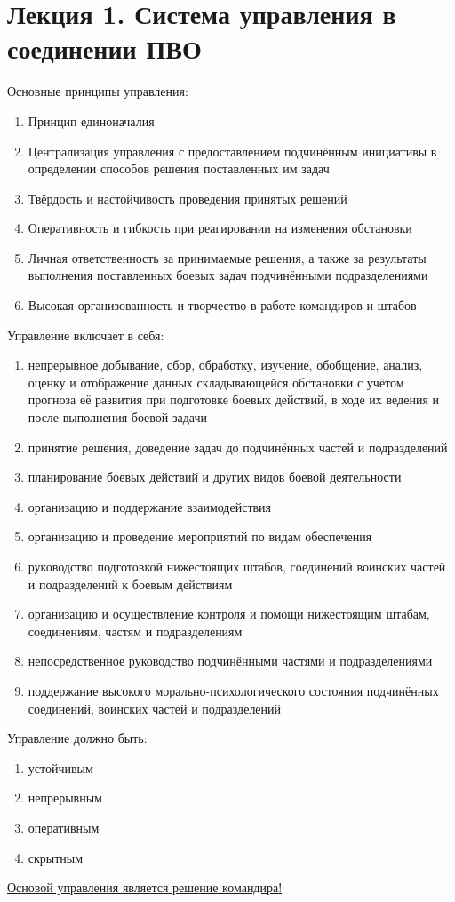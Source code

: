 \documentclass[a4paper,12pt]{article}
\begin{document}
	\section{\bf Лекция 1. Система управления в соединении ПВО}
	Основные принципы управления:
	\begin{enumerate}
		\item Принцип единоначалия
		\item Централизация управления с предоставлением подчинённым инициативы в определении
		способов решения поставленных им задач
		\item Твёрдость и настойчивость проведения принятых решений
		\item Оперативность и гибкость при реагировании на изменения обстановки
		\item Личная ответственность за принимаемые решения, а также за результаты выполнения
		поставленных боевых задач подчинёнными подразделениями
		\item Высокая организованность и творчество в работе командиров и штабов
	\end{enumerate}
	Управление включает в себя:
	\begin{enumerate}
		\item непрерывное добывание, сбор, обработку, изучение, обобщение, анализ, оценку и 
		отображение данных складывающейся обстановки с учётом прогноза её развития при
		подготовке боевых действий, в ходе их ведения и после выполнения боевой задачи
		\item принятие решения, доведение задач до подчинённых частей и подразделений
		\item планирование боевых действий и других видов боевой деятельности
		\item организацию и поддержание взаимодействия
		\item организацию и проведение мероприятий по видам обеспечения
		\item руководство подготовкой нижестоящих штабов, соединений воинских частей и 
		подразделений к боевым действиям
		\item организацию и осуществление контроля и помощи нижестоящим штабам, соединениям, 
		частям и подразделениям
		\item непосредственное руководство подчинёнными частями и подразделениями
		\item поддержание высокого морально-психологического состояния подчинённых соединений, 
		воинских частей и подразделений
	\end{enumerate}
	Управление должно быть:
	\begin{enumerate}
		\item устойчивым
		\item непрерывным
		\item оперативным
		\item скрытным
	\end{enumerate} 
	\underline{Основой управления является решение командира!}
	
\end{document}
